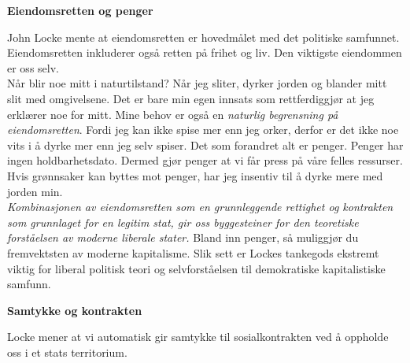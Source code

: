 \documentclass[11pt, a4paper]{article}
\newenvironment{sectionbox}[1][]{%
    \begin{sectionboxinner}
    \textbf{\large #1}
    \vspace{1pt}
    \newline
}{%
    \end{sectionboxinner}
}
\begin{document}
\begin{sectionbox}[Eiendomsretten og penger]
\begin{flushleft}
John Locke mente at eiendomsretten er hovedmålet med det politiske samfunnet. Eiendomsretten inkluderer også retten på frihet og liv. Den viktigste eiendommen er oss selv. \\

Når blir noe mitt i naturtilstand? Når jeg sliter, dyrker jorden og blander mitt slit med omgivelsene. Det er bare min egen innsats som rettferdiggjør at jeg erklærer noe for mitt. Mine behov er også en \textit{naturlig begrensning på eiendomsretten}. Fordi jeg kan ikke spise mer enn jeg orker, derfor er det ikke noe vits i å dyrke mer enn jeg selv spiser. Det som forandret alt er penger. Penger har ingen holdbarhetsdato. Dermed gjør penger at vi får press på våre felles ressurser. Hvis grønnsaker kan byttes mot penger, har jeg insentiv til å dyrke mere med jorden min.\\

\textit{Kombinasjonen av eiendomsretten som en grunnleggende rettighet og kontrakten som grunnlaget for en legitim stat, gir oss byggesteiner for den teoretiske forståelsen av moderne liberale stater.} Bland inn penger, så muliggjør du fremvektsten av moderne kapitalisme. Slik sett er Lockes tankegods ekstremt viktig for liberal politisk teori og selvforståelsen til demokratiske kapitalistiske samfunn.
    
\end{flushleft}
\end{sectionbox}

\begin{sectionbox}[Samtykke og kontrakten]


Locke mener at vi automatisk gir samtykke til sosialkontrakten ved å oppholde oss i et stats territorium.
\end{sectionbox}
\end{document}
